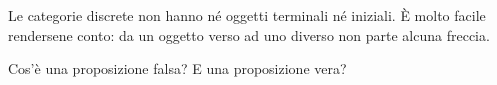 \begin{esempio}
Le categorie discrete non hanno né oggetti terminali né iniziali. È molto facile rendersene conto: da un oggetto verso ad uno diverso non parte alcuna freccia.
\end{esempio}

\begin{esercizio}
Cos'è una proposizione falsa? E una proposizione vera?
\end{esercizio}